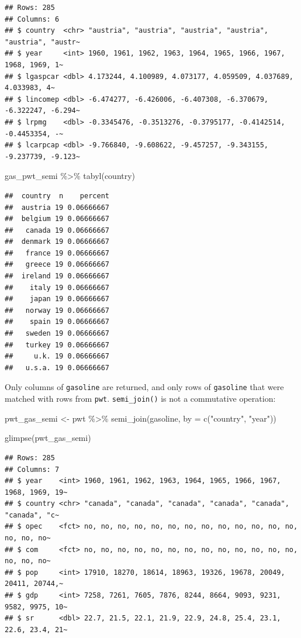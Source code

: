 \documentclass[
]{article}
\newenvironment{Shaded}{\begin{snugshade}}{\end{snugshade}}
\newcommand{\AttributeTok}[1]{\textcolor[rgb]{0.77,0.63,0.00}{#1}}
\newcommand{\FunctionTok}[1]{\textcolor[rgb]{0.00,0.00,0.00}{#1}}
\newcommand{\NormalTok}[1]{#1}
\newcommand{\OtherTok}[1]{\textcolor[rgb]{0.56,0.35,0.01}{#1}}
\newcommand{\SpecialCharTok}[1]{\textcolor[rgb]{0.00,0.00,0.00}{#1}}
\newcommand{\StringTok}[1]{\textcolor[rgb]{0.31,0.60,0.02}{#1}}
\begin{document}
\begin{verbatim}
## Rows: 285
## Columns: 6
## $ country  <chr> "austria", "austria", "austria", "austria", "austria", "austr~
## $ year     <int> 1960, 1961, 1962, 1963, 1964, 1965, 1966, 1967, 1968, 1969, 1~
## $ lgaspcar <dbl> 4.173244, 4.100989, 4.073177, 4.059509, 4.037689, 4.033983, 4~
## $ lincomep <dbl> -6.474277, -6.426006, -6.407308, -6.370679, -6.322247, -6.294~
## $ lrpmg    <dbl> -0.3345476, -0.3513276, -0.3795177, -0.4142514, -0.4453354, -~
## $ lcarpcap <dbl> -9.766840, -9.608622, -9.457257, -9.343155, -9.237739, -9.123~
\end{verbatim}

\begin{Shaded}
\begin{Highlighting}[]
\NormalTok{gas\_pwt\_semi }\SpecialCharTok{\%\textgreater{}\%}
  \FunctionTok{tabyl}\NormalTok{(country)}
\end{Highlighting}
\end{Shaded}

\begin{verbatim}
##  country  n    percent
##  austria 19 0.06666667
##  belgium 19 0.06666667
##   canada 19 0.06666667
##  denmark 19 0.06666667
##   france 19 0.06666667
##   greece 19 0.06666667
##  ireland 19 0.06666667
##    italy 19 0.06666667
##    japan 19 0.06666667
##   norway 19 0.06666667
##    spain 19 0.06666667
##   sweden 19 0.06666667
##   turkey 19 0.06666667
##     u.k. 19 0.06666667
##   u.s.a. 19 0.06666667
\end{verbatim}

Only columns of \texttt{gasoline} are returned, and only rows of \texttt{gasoline} that were matched with rows
from \texttt{pwt}. \texttt{semi\_join()} is not a commutative operation:

\begin{Shaded}
\begin{Highlighting}[]
\NormalTok{pwt\_gas\_semi }\OtherTok{\textless{}{-}}\NormalTok{ pwt }\SpecialCharTok{\%\textgreater{}\%}
  \FunctionTok{semi\_join}\NormalTok{(gasoline, }\AttributeTok{by =} \FunctionTok{c}\NormalTok{(}\StringTok{"country"}\NormalTok{, }\StringTok{"year"}\NormalTok{))}

\FunctionTok{glimpse}\NormalTok{(pwt\_gas\_semi)}
\end{Highlighting}
\end{Shaded}

\begin{verbatim}
## Rows: 285
## Columns: 7
## $ year    <int> 1960, 1961, 1962, 1963, 1964, 1965, 1966, 1967, 1968, 1969, 19~
## $ country <chr> "canada", "canada", "canada", "canada", "canada", "canada", "c~
## $ opec    <fct> no, no, no, no, no, no, no, no, no, no, no, no, no, no, no, no~
## $ com     <fct> no, no, no, no, no, no, no, no, no, no, no, no, no, no, no, no~
## $ pop     <int> 17910, 18270, 18614, 18963, 19326, 19678, 20049, 20411, 20744,~
## $ gdp     <int> 7258, 7261, 7605, 7876, 8244, 8664, 9093, 9231, 9582, 9975, 10~
## $ sr      <dbl> 22.7, 21.5, 22.1, 21.9, 22.9, 24.8, 25.4, 23.1, 22.6, 23.4, 21~
\end{verbatim}
\end{document}
